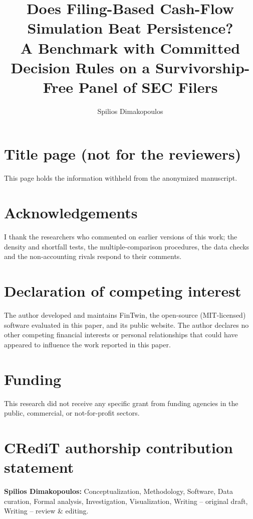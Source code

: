 \documentclass[preprint,12pt]{elsarticle}
\begin{document}
\begin{frontmatter}
\title{Does Filing-Based Cash-Flow Simulation Beat Persistence?\\A Benchmark with Committed Decision Rules on a Survivorship-Free Panel of SEC Filers}
\author{Spilios Dimakopoulos}
\address{Independent researcher, Athens, Greece}
\end{frontmatter}

\section*{Title page (not for the reviewers)}
This page holds the information withheld from the anonymized manuscript.

\section*{Acknowledgements}
I thank the researchers who commented on earlier versions of this work; the density and shortfall tests, the multiple-comparison procedures, the data checks and the non-accounting rivals respond to their comments.

\section*{Declaration of competing interest}
The author developed and maintains FinTwin, the open-source (MIT-licensed) software evaluated in this paper, and its public website. The author declares no other competing financial interests or personal relationships that could have appeared to influence the work reported in this paper.

\section*{Funding}
This research did not receive any specific grant from funding agencies in the public, commercial, or not-for-profit sectors.

\section*{CRediT authorship contribution statement}
\textbf{Spilios Dimakopoulos:} Conceptualization, Methodology, Software, Data curation, Formal analysis, Investigation, Visualization, Writing -- original draft, Writing -- review \& editing.
\end{document}
